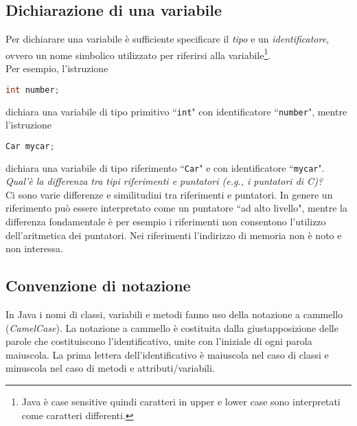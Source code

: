 \documentclass{article}
\begin{document}
\subsection{Dichiarazione di una variabile}
Per dichiarare una variabile è sufficiente specificare il \emph{tipo} e un \emph{identificatore}, ovvero un nome simbolico utilizzato per riferirsi alla variabile\footnote{Java è case sensitive quindi caratteri in upper e lower case sono interpretati come caratteri differenti.}. \\
Per esempio, l'istruzione
\begin{lstlisting}[language=Java,escapechar=|]
int number;
\end{lstlisting}
dichiara una variabile di tipo primitivo ``\texttt{int}" con identificatore ``\texttt{number}", mentre l'istruzione
\begin{lstlisting}[language=Java,escapechar=|]
Car mycar;
\end{lstlisting}
dichiara una variabile di tipo riferimento ``\texttt{Car}" e con identificatore ``\texttt{mycar}".\\

\emph{Qual'è la differenza tra tipi riferimenti e puntatori (e.g., i puntatori di C)?}\\
Ci sono varie differenze e similitudini tra riferimenti e puntatori. In genere un riferimento può essere interpretato come un puntatore ``ad alto livello", mentre la differenza fondamentale è per esempio i riferimenti non consentono l'utilizzo dell'aritmetica dei puntatori. Nei riferimenti l'indirizzo di memoria non è noto e non interessa.

\subsection{Convenzione di notazione}
In Java i nomi di classi, variabili e metodi fanno uso della notazione a cammello (\emph{CamelCase}).
La notazione a cammello è costituita dalla giustapposizione delle parole che costituiscono l'identificativo, unite con l'iniziale di ogni parola maiuscola. 
La prima lettera dell'identificativo è maiuscola nel caso di classi e minuscola nel caso di metodi e attributi/variabili. 
\end{document}

